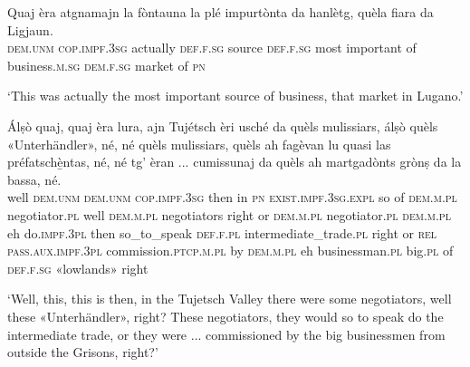 \clearpage

\begin{linenumbers}
\gll Quaj èra atgnamajn la fòntauna la plé impurtònta da hanlètg, quèla fiara\footnotemark{} da Ligjaun.\\
\textsc{dem.unm} \textsc{cop.impf.3sg} actually  \textsc{def.f.sg} source \textsc{def.f.sg} most important of business.\textsc{m.sg} \textsc{dem.f.sg} market of \textsc{pn}\\
\end{linenumbers}
\medskip
\glt `This was actually the most important source of  business, that market in Lugano.'
\medskip
 
\begin{linenumbers}
\gll Álṣò quaj, quaj èra lura, ajn Tujétsch èri usché da quèls mulissiars, álṣò quèls «Unterhändler»\footnotemark, né, né quèls mulissiars, quèls ah fagèvan lu quasi las préfatschè̱ntas, né, né tg’ èran ... cumissunaj da quèls ah martgadònts grònṣ da la bassa, né.\\
well \textsc{dem.unm} \textsc{dem.unm} \textsc{cop.impf.3sg} then in \textsc{pn} \textsc{exist.impf.3sg.expl} so of \textsc{dem.m.pl} negotiator.\textsc{pl} well \textsc{dem.m.pl} negotiators right or \textsc{dem.m.pl} negotiator.\textsc{pl} \textsc{dem.m.pl} eh do.\textsc{impf.3pl} then so\_to\_speak \textsc{def.f.pl}  intermediate\_trade.\textsc{pl} right or \textsc{rel} \textsc{pass.aux.impf.3pl} {} commission.\textsc{ptcp.m.pl} by \textsc{dem.m.pl} eh businessman.\textsc{pl} big.\textsc{pl} of \textsc{def.f.sg} «lowlands» right \\
\end{linenumbers}
\medskip
 \glt `Well, this, this is then, in the Tujetsch Valley there were some negotiators, well these «Unterhändler», right? These negotiators, they would so to speak do the intermediate trade, or they were ... commissioned by the big businessmen from outside the Grisons, right?'
\medskip

